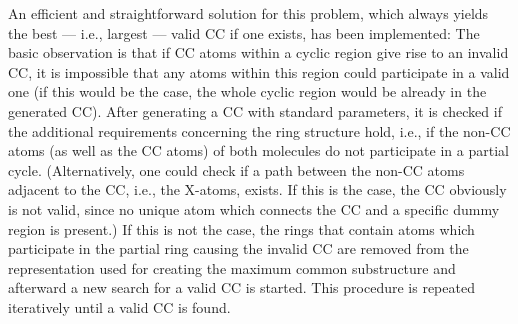 An efficient and straightforward solution for this problem, which always yields the best --- i.e., largest --- valid CC if one exists, has been implemented:
The basic observation is that if CC atoms within a cyclic region give rise to an invalid CC, it is impossible that any atoms within this region could participate in a valid one (if this would be the case, the whole cyclic region would be already in the generated CC).
After generating a CC with standard parameters, it is checked if the additional requirements concerning the ring structure hold, i.e., if the non-CC atoms (as well as the CC atoms) of both molecules do not participate in a partial cycle.
(Alternatively, one could check if a path between the non-CC atoms adjacent to the CC, i.e., the X-atoms, exists. If this is the case, the CC obviously is not valid, since no unique atom which connects the CC and a specific dummy region is present.) If this is not the case, the rings that contain atoms which participate in the partial ring causing the invalid CC are removed from the representation used for creating the maximum common substructure and afterward a new search for a valid CC is started. This procedure is repeated iteratively until a valid CC is found.





